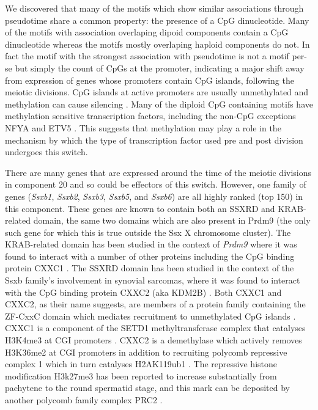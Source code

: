 We discovered that many of the motifs which show similar associations through pseudotime share a common property: the presence of a CpG dinucleotide.
Many of the motifs with association overlaping dipoid components contain a CpG dinucleotide whereas the motifs mostly overlaping haploid components do not.
In fact the motif with the strongest association with pseudotime is not a motif per-se but simply the count of CpGs at the promoter, indicating a major shift away from expression of genes whose promoters contain CpG islands, following the meiotic divisions.
CpG islands at active promoters are usually unmethylated and methylation can cause silencing \parencite{Li2014DNA}.
Many of the diploid CpG containing motifs have methylation sensitive transcription factors, including the non-CpG exceptions NFYA and ETV5 \parencite{Domcke2015Competition, Wang2017NRF1}.
This suggests that methylation may play a role in the mechanism by which the type of transcription factor used pre and post division undergoes this switch.

\label{sec:ssx}
There are many genes that are expressed around the time of the meiotic divisions in component 20 and so could be effectors of this switch.
However, one family of genes (\textit{Ssxb1}, \textit{Ssxb2}, \textit{Ssxb3}, \textit{Ssxb5}, and \textit{Ssxb6}) are all highly ranked (top 150) in this component.
These genes are known to contain both an SSXRD and KRAB-related domain, the same two domains which are also present in Prdm9 (the only such gene for which this is true outside the Ssx X chromosome cluster).
The KRAB-related domain has been studied in the context of \textit{Prdm9} where it was found to interact with a number of other proteins including the CpG binding protein CXXC1 \parencite{Imai2017PRDM9, Parvanov2017PRDM9}.
The SSXRD domain has been studied in the context of the Ssxb family's involvement in synovial sarcomas, where it was found to interact with the CpG binding protein CXXC2 (aka KDM2B) \parencite{Banito2018SS18SSX}.
Both CXXC1 and CXXC2, as their name suggests, are members of a protein family containing the ZF-CxxC domain which mediates recruitment to unmethylated CpG islands \parencite[reviewed in][]{Long2013ZFCxxC}.
CXXC1 is a component of the SETD1 methyltransferase complex that catalyses H3K4me3 at CGI promoters \parencite{Lee2005CpGbinding}.
CXXC2 is a demethylase which actively removes H3K36me2 at CGI promoters in addition to recruiting polycomb repressive complex 1 which in turn catalyses H2AK119ub1 \parencite{He2008H3K36, Farcas2012KDM2B, He2013Kdm2b, Wu2013Fbxl10}.
The repressive histone modification H3k27me3 has been reported to increase substantially from pachytene to the round spermatid stage, and this mark can be deposited by another polycomb family complex PRC2 \parencite{Sin2015Poised}.


